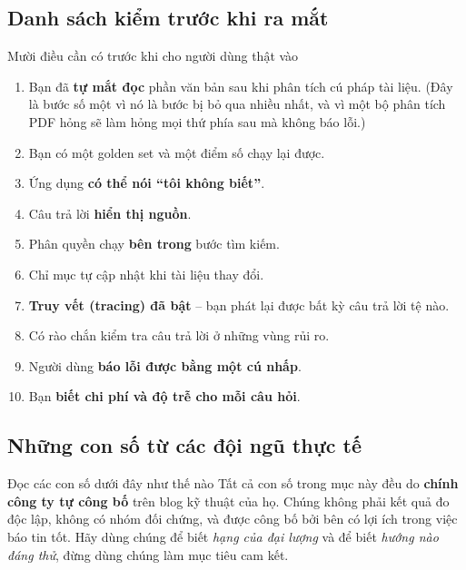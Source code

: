 \subsection{Danh sách kiểm trước khi ra mắt}
\label{ssec:rag_launch_checklist}

\begin{checklist}{Mười điều cần có trước khi cho người dùng thật vào}
\begin{enumerate}
	\item Bạn đã \textbf{tự mắt đọc} phần văn bản sau khi phân tích cú pháp tài liệu. (Đây là bước số một vì nó là bước bị bỏ qua nhiều nhất, và vì một bộ phân tích PDF hỏng sẽ làm hỏng mọi thứ phía sau mà không báo lỗi.)
	\item Bạn có một golden set và một điểm số chạy lại được.
	\item Ứng dụng \textbf{có thể nói “tôi không biết”}.
	\item Câu trả lời \textbf{hiển thị nguồn}.
	\item Phân quyền chạy \textbf{bên trong} bước tìm kiếm.
	\item Chỉ mục tự cập nhật khi tài liệu thay đổi.
	\item \textbf{Truy vết (tracing) đã bật} -- bạn phát lại được bất kỳ câu trả lời tệ nào.
	\item Có rào chắn kiểm tra câu trả lời ở những vùng rủi ro.
	\item Người dùng \textbf{báo lỗi được bằng một cú nhấp}.
	\item Bạn \textbf{biết chi phí và độ trễ cho mỗi câu hỏi}.
\end{enumerate}
\end{checklist}

\subsection{Những con số từ các đội ngũ thực tế}
\label{ssec:rag_industry_numbers}

\begin{keyidea}{Đọc các con số dưới đây như thế nào}
Tất cả con số trong mục này đều do \textbf{chính công ty tự công bố} trên blog kỹ thuật của họ. Chúng không phải kết quả đo độc lập, không có nhóm đối chứng, và được công bố bởi bên có lợi ích trong việc báo tin tốt. Hãy dùng chúng để biết \emph{hạng của đại lượng} và để biết \emph{hướng nào đáng thử}, đừng dùng chúng làm mục tiêu cam kết.
\end{keyidea}

